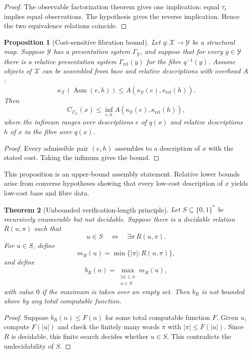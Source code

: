 \documentclass[11pt]{article}
\newtheorem{theorem}{Theorem}[section]
\newtheorem{proposition}[theorem]{Proposition}
\begin{document}
\begin{proof}
The observable factorization theorem gives one implication: equal \(\tau_r\) implies equal observations. The hypothesis gives the reverse implication. Hence the two equivalence relations coincide.
\end{proof}

\begin{proposition}[Cost-sensitive fibration bound]
Let \(q:\mathcal X\to\mathcal Y\) be a structural map. Suppose \(\mathcal Y\) has a presentation system \(\Gamma_\mathcal Y\), and suppose that for every \(y\in\mathcal Y\) there is a relative presentation system \(\Gamma_{\mathrm{rel}}(y)\) for the fibre \(q^{-1}(y)\). Assume objects of \(\mathcal X\) can be assembled from base and relative descriptions with overhead \(A\):
\[
\kappa_\mathcal X(\operatorname{Asm}(e,h))
\leq
A(\kappa_\mathcal Y(e),\kappa_{\mathrm{rel}}(h)).
\]
Then
\[
C_{\Gamma_\mathcal X}(x)
\leq
\inf_{e,h}
A(\kappa_\mathcal Y(e),\kappa_{\mathrm{rel}}(h)),
\]
where the infimum ranges over descriptions \(e\) of \(q(x)\) and relative descriptions \(h\) of \(x\) in the fibre over \(q(x)\).
\end{proposition}

\begin{proof}
Every admissible pair \((e,h)\) assembles to a description of \(x\) with the stated cost. Taking the infimum gives the bound.
\end{proof}

This proposition is an upper-bound assembly statement. Relative lower bounds arise from converse hypotheses showing that every low-cost description of \(x\) yields low-cost base and fibre data.

\begin{theorem}[Unbounded verification-length principle]
Let \(S\subseteq\{0,1\}^*\) be recursively enumerable but not decidable. Suppose there is a decidable relation \(R(u,\pi)\) such that
\[
u\in S
\quad\Longleftrightarrow\quad
\exists \pi\ R(u,\pi).
\]
For \(u\in S\), define
\[
m_R(u)=\min\{|\pi|:R(u,\pi)\},
\]
and define
\[
b_R(n)=
\max_{\substack{|u|\leq n\\u\in S}}
m_R(u),
\]
with value \(0\) if the maximum is taken over an empty set. Then \(b_R\) is not bounded above by any total computable function.
\end{theorem}

\begin{proof}
Suppose \(b_R(n)\leq F(n)\) for some total computable function \(F\). Given \(u\), compute \(F(|u|)\) and check the finitely many words \(\pi\) with \(|\pi|\leq F(|u|)\). Since \(R\) is decidable, this finite search decides whether \(u\in S\). This contradicts the undecidability of \(S\).
\end{proof}
\end{document}
